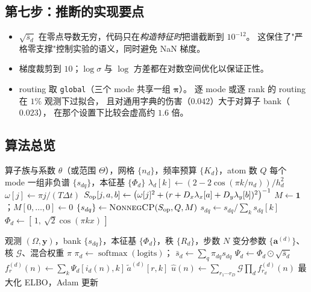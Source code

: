 \documentclass[11pt,a4paper]{article}
\begin{document}
\subsection{第七步：推断的实现要点}

\begin{itemize}[leftmargin=1.6em]
  \item $\sqrt{\bar{s}_d}$ 在零点导数无穷，代码只在\emph{构造特征时}把谱截断到 $10^{-12}$。
        这保住了"严格零支撑"控制实验的语义，同时避免 NaN 梯度。
  \item 梯度裁剪到 $10$；$\log \sigma$ 与 $\log$ 方差都在对数空间优化以保证正性。
  \item routing 取 \texttt{global}（三个 mode 共享一组 $\boldsymbol{\pi}$）。
        逐 mode 或逐 rank 的 routing 在 $1\%$ 观测下过拟合，
        且对通用字典的伤害（$0.042$）大于对算子 bank（$0.023$），
        在那个设置下比较会虚高约 $1.6$ 倍。
\end{itemize}

\subsection{算法总览}

\begin{algorithm}[t]
\caption{构造逐维核 bank（\textbf{不使用任何观测数据}）}
\label{alg:bank}
\begin{algorithmic}[1]
\Require 算子族与系数 $\theta$（或范围 $\Theta$），网格 $\{n_d\}$，频率预算 $\{K_d\}$，atom 数 $Q$
\Ensure 每个 mode 一组非负谱 $\{s_{dq}\}$，本征基 $\{\Phi_d\}$
  \State $\lambda_d[k] \gets (2 - 2\cos(\pi k / n_d)) / h_d^2$ 
\EndFor
\State $\omega[j] \gets \pi j / (T \Delta t)$
\State $S_{\mathrm{op}}[j,a,b] \gets \bigl(\omega[j]^2 + (r + D_x \lambda_x[a] + D_y \lambda_y[b])^2\bigr)^{-1}$
\State $M \gets \mathbf{1}$；$M[0,\dots,0] \gets 0$ 
\State $\{s_{dq}\} \gets \textsc{NonnegCP}(S_{\mathrm{op}}, Q, M)$ 
\State $s_{dq} \gets s_{dq} / \sum_k s_{dq}[k]$ 
\State $\Phi_d \gets [\,1,\ \sqrt{2}\cos(\pi k x)\,]$ 
\end{algorithmic}
\end{algorithm}

\begin{algorithm}[t]
\caption{拟合（\textbf{不使用任何留出数据}）}
\label{alg:fit}
\begin{algorithmic}[1]
\Require 观测 $(\Omega, \mathbf{y})$，bank $\{s_{dq}\}$，本征基 $\{\Phi_d\}$，秩 $\{R_d\}$，步数 $N$
\Ensure 变分参数 $\{\mathbf{a}^{(d)}\}$、核 $\mathcal{G}$、混合权重 $\pi$
  \State $\pi_d \gets \operatorname{softmax}(\text{logits})$；
         $\bar{s}_d \gets \sum_q \pi_{dq} s_{dq}$
  \State $\Psi_d \gets \Phi_d \odot \sqrt{\bar{s}_d}$ 
  \State $f^{(d)}_r(n) \gets \sum_k \Psi_d[i_d(n), k]\, \tilde{a}^{(d)}[r,k]$
  \State $\hat{u}(n) \gets \sum_{r_1 \cdots r_D} \mathcal{G}\prod_d f^{(d)}_{r_d}(n)$
  \State 最大化 ELBO，Adam 更新
\EndFor
\end{algorithmic}
\end{algorithm}
\end{document}
